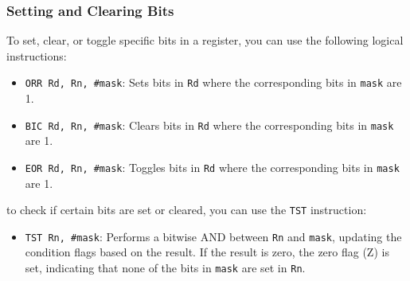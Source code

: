 \subsubsection*{Setting and Clearing Bits}
To set, clear, or toggle specific bits in a register, you can use the following logical instructions:
\begin{itemize}[nosep]
    \item \texttt{ORR Rd, Rn, \#mask}: Sets bits in \texttt{Rd} where the corresponding bits in \texttt{mask} are 1.
    \item \texttt{BIC Rd, Rn, \#mask}: Clears bits in \texttt{Rd} where the corresponding bits in \texttt{mask} are 1.
    \item \texttt{EOR Rd, Rn, \#mask}: Toggles bits in \texttt{Rd} where the corresponding bits in \texttt{mask} are 1.
\end{itemize}
to check if certain bits are set or cleared, you can use the \texttt{TST} instruction:
\begin{itemize}[nosep]
    \item \texttt{TST Rn, \#mask}: Performs a bitwise AND between \texttt{Rn} and \texttt{mask}, updating the condition flags based on the result. If the result is zero, the zero flag (Z) is set, indicating that none of the bits in \texttt{mask} are set in \texttt{Rn}.
\end{itemize}

